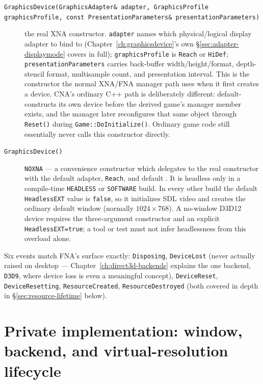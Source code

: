 \begin{description}
\item[\texttt{GraphicsDevice(GraphicsAdapter\& adapter, GraphicsProfile graphicsProfile, const PresentationParameters\& presentationParameters)}]
  the real XNA constructor. \texttt{adapter} names which physical/logical display adapter to
  bind to (Chapter~\ref{ch:graphicsdevice}'s own \S\ref{sec:adapter-displaymode} covers
   in full); \texttt{graphicsProfile} is \texttt{Reach} or
  \texttt{HiDef}; \texttt{presentationParameters} carries back-buffer width/height/format,
  depth-stencil format, multisample count, and presentation interval. This is the constructor
  the normal XNA/FNA manager path uses when it first creates a device. CNA's ordinary C++
   path is deliberately different:  default-constructs its own
  device before the derived game's manager member exists, and the manager later reconfigures that
  same object through \texttt{Reset()} during \texttt{Game::DoInitialize()}. Ordinary game code
  still essentially never calls this constructor directly.
\item[\texttt{GraphicsDevice()}]
  \texttt{NOXNA} --- a convenience constructor which delegates to the real constructor with the
  default adapter, \texttt{Reach}, and default . It is
  headless only in a compile-time \texttt{HEADLESS} or \texttt{SOFTWARE} build. In every other
  build the default \texttt{HeadlessEXT} value is \texttt{false}, so it initializes SDL video
  and creates the ordinary default window (normally $1024\times768$). A no-window D3D12 device
  requires the three-argument constructor and an explicit \texttt{HeadlessEXT=true}; a tool or
  test must not infer headlessness from this overload alone.
\end{description}

Six events match FNA's surface exactly: \texttt{Disposing}, \texttt{DeviceLost} (never actually
raised on desktop --- Chapter~\ref{ch:direct3d-backends} explains the one backend,
\texttt{D3D9}, where device loss is even a meaningful concept), \texttt{DeviceReset},
\texttt{DeviceResetting}, \texttt{ResourceCreated}, \texttt{ResourceDestroyed} (both covered in
depth in \S\ref{sec:resource-lifetime} below).

\section{Private implementation: window, backend, and virtual-resolution lifecycle}
\label{sec:private-lifecycle}

